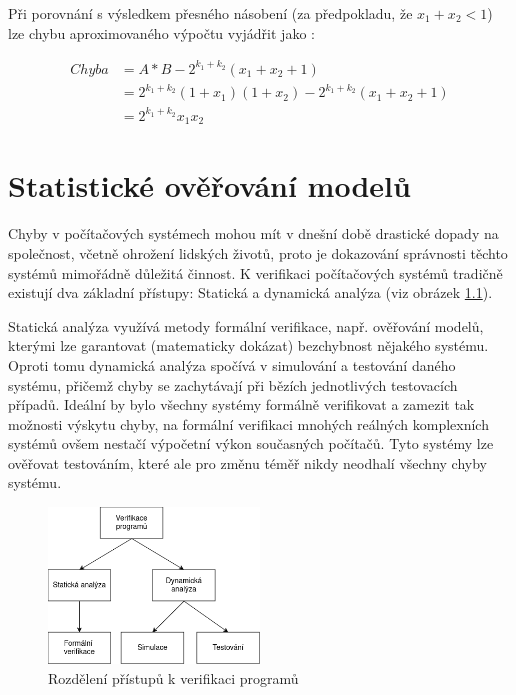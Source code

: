 Při porovnání s výsledkem přesného násobení (za předpokladu, že $x_1 + x_2 < 1$) lze chybu aproximovaného výpočtu vyjádřit jako \cite{approx_mult_survey}:

\begin{equation}
    \begin{array}{rl}
       Chyba & = A*B - 2^{k_1+k_2}(x_1+x_2+1) \\
             & = 2^{k_1+k_2}(1+x_1)(1+x_2)-2^{k_1+k_2}(x_1+x_2+1) \\
             & = 2^{k_1+k_2}x_1x_2
    \end{array}
\end{equation}

\chapter{Statistické ověřování modelů}
\label{smc}
Chyby v počítačových systémech mohou mít v dnešní době drastické dopady na společnost, včetně ohrožení lidských životů, proto je dokazování správnosti těchto systémů mimořádně důležitá činnost. K verifikaci počítačových systémů tradičně existují dva základní přístupy: Statická a dynamická analýza (viz obrázek \ref{fig:verifikace_rozdeleni}).

Statická analýza využívá metody formální verifikace, např. ověřování modelů, kterými lze garantovat (matematicky dokázat) bezchybnost nějakého systému. Oproti tomu dynamická analýza spočívá v simulování a testování daného systému, přičemž chyby se zachytávají při bězích jednotlivých testovacích případů. Ideální by bylo všechny systémy formálně verifikovat a zamezit tak možnosti výskytu chyby, na formální verifikaci mnohých reálných komplexních systémů ovšem nestačí výpočetní výkon současných počítačů. Tyto systémy lze ověřovat testováním, které ale pro změnu téměř nikdy neodhalí všechny chyby systému.

\begin{figure}[H]
    \centering
    \includegraphics[width=0.5\textwidth]{obrazky-figures/verifikace_rozdeleni.png}
    \caption{Rozdělení přístupů k verifikaci programů}
    \label{fig:verifikace_rozdeleni}
\end{figure}

